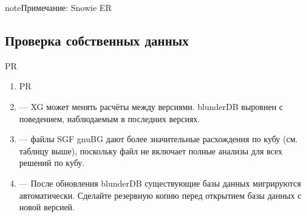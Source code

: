 \documentclass[letterpaper,10pt,russian]{sphinxmanual}
\begin{document}
\begin{sphinxadmonition}{note}{Примечание:}
\sphinxAtStartPar
Snowie ER
\end{sphinxadmonition}


\subsection{Проверка собственных данных}
\label{\detokenize{stats_parity:valider-vos-propres-chiffres}}
\sphinxAtStartPar
PR
\begin{enumerate}
%
\item {} 
\sphinxAtStartPar
PR

\item {} 
\sphinxAtStartPar
{} — XG может менять расчёты между версиями. blunderDB выровнен с поведением, наблюдаемым в последних версиях.

\item {} 
\sphinxAtStartPar
{} — файлы SGF gnuBG дают более значительные расхождения по кубу (см. таблицу выше), поскольку файл не включает полные анализы для всех решений по кубу.

\item {} 
\sphinxAtStartPar
{} — После обновления blunderDB существующие базы данных мигрируются автоматически. Сделайте резервную копию перед открытием базы данных с новой версией.

\end{enumerate}
\end{document}
